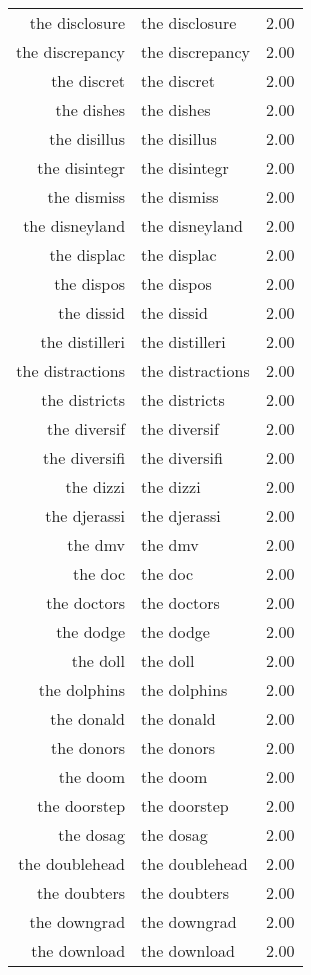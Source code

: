 \begin{table}[ht]
\begin{tabular}{rlr}
  the disclosure & the disclosure & 2.00 \\ 
  the discrepancy & the discrepancy & 2.00 \\ 
  the discret & the discret & 2.00 \\ 
  the dishes & the dishes & 2.00 \\ 
  the disillus & the disillus & 2.00 \\ 
  the disintegr & the disintegr & 2.00 \\ 
  the dismiss & the dismiss & 2.00 \\ 
  the disneyland & the disneyland & 2.00 \\ 
  the displac & the displac & 2.00 \\ 
  the dispos & the dispos & 2.00 \\ 
  the dissid & the dissid & 2.00 \\ 
  the distilleri & the distilleri & 2.00 \\ 
  the distractions & the distractions & 2.00 \\ 
  the districts & the districts & 2.00 \\ 
  the diversif & the diversif & 2.00 \\ 
  the diversifi & the diversifi & 2.00 \\ 
  the dizzi & the dizzi & 2.00 \\ 
  the djerassi & the djerassi & 2.00 \\ 
  the dmv & the dmv & 2.00 \\ 
  the doc & the doc & 2.00 \\ 
  the doctors & the doctors & 2.00 \\ 
  the dodge & the dodge & 2.00 \\ 
  the doll & the doll & 2.00 \\ 
  the dolphins & the dolphins & 2.00 \\ 
  the donald & the donald & 2.00 \\ 
  the donors & the donors & 2.00 \\ 
  the doom & the doom & 2.00 \\ 
  the doorstep & the doorstep & 2.00 \\ 
  the dosag & the dosag & 2.00 \\ 
  the doublehead & the doublehead & 2.00 \\ 
  the doubters & the doubters & 2.00 \\ 
  the downgrad & the downgrad & 2.00 \\ 
  the download & the download & 2.00 \\ 

\end{tabular}
\end{table}
